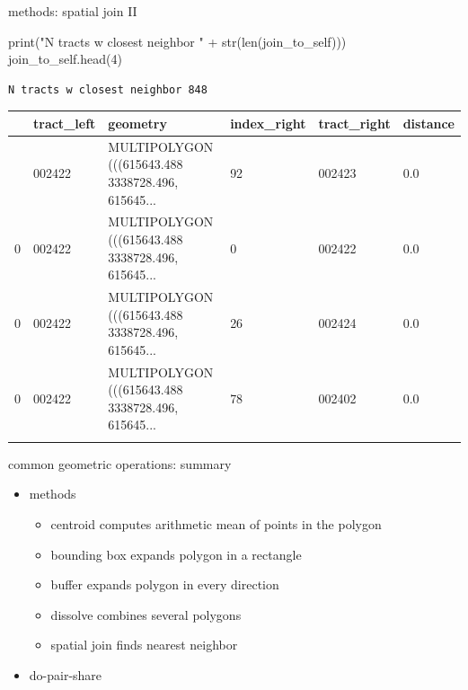 \documentclass[
  ignorenonframetext,
]{beamer}
\newenvironment{Shaded}{\begin{snugshade}}{\end{snugshade}}
\newcommand{\BuiltInTok}[1]{\textcolor[rgb]{0.00,0.23,0.31}{#1}}
\newcommand{\DecValTok}[1]{\textcolor[rgb]{0.68,0.00,0.00}{#1}}
\newcommand{\NormalTok}[1]{\textcolor[rgb]{0.00,0.23,0.31}{#1}}
\newcommand{\OperatorTok}[1]{\textcolor[rgb]{0.37,0.37,0.37}{#1}}
\newcommand{\StringTok}[1]{\textcolor[rgb]{0.13,0.47,0.30}{#1}}
\providecommand{\tightlist}{%
  \setlength{\itemsep}{0pt}\setlength{\parskip}{0pt}}\usepackage{longtable,booktabs,array}
\begin{document}
\begin{frame}[fragile]{methods: spatial join II}
\label{methods-spatial-join-ii}
\begin{Shaded}
\begin{Highlighting}[]
\BuiltInTok{print}\NormalTok{(}\StringTok{"N tracts w closest neighbor "} \OperatorTok{+} \BuiltInTok{str}\NormalTok{(}\BuiltInTok{len}\NormalTok{(join\_to\_self)))}
\NormalTok{join\_to\_self.head(}\DecValTok{4}\NormalTok{)}
\end{Highlighting}
\end{Shaded}

\begin{verbatim}
N tracts w closest neighbor 848
\end{verbatim}

\begin{longtable}[]{@{}llllll@{}}
\toprule\noalign{}
& tract\_left & geometry & index\_right & tract\_right & distance \\
\midrule\noalign{}
\endhead
0 & 002422 & MULTIPOLYGON (((615643.488 3338728.496, 615645... & 92 &
002423 & 0.0 \\
0 & 002422 & MULTIPOLYGON (((615643.488 3338728.496, 615645... & 0 &
002422 & 0.0 \\
0 & 002422 & MULTIPOLYGON (((615643.488 3338728.496, 615645... & 26 &
002424 & 0.0 \\
0 & 002422 & MULTIPOLYGON (((615643.488 3338728.496, 615645... & 78 &
002402 & 0.0 \\
\bottomrule\noalign{}
\end{longtable}
\end{frame}

\begin{frame}{common geometric operations: summary}
\label{common-geometric-operations-summary}
\begin{itemize}
\tightlist
\item
  methods

  \begin{itemize}
  \tightlist
  \item
    centroid computes arithmetic mean of points in the polygon
  \item
    bounding box expands polygon in a rectangle
  \item
    buffer expands polygon in every direction
  \item
    dissolve combines several polygons
  \item
    spatial join finds nearest neighbor
  \end{itemize}
\item
  do-pair-share
\end{itemize}
\end{frame}
\end{document}
